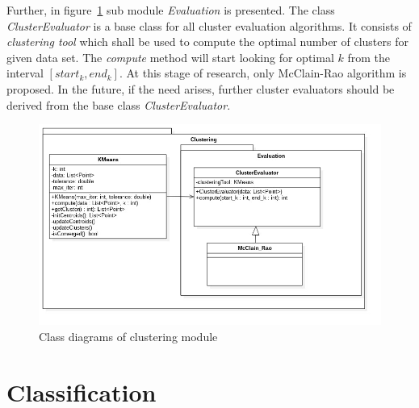 \documentclass{mini}
\begin{document}
Further, in figure~\ref{fig:clustering_class} sub module \textit{Evaluation} is presented. The class \textit{ClusterEvaluator} is a base class for all cluster evaluation algorithms. It consists of \textit{clustering tool} which shall be used to compute the optimal number of clusters for given data set. The \textit{compute} method will start looking for optimal $k$ from the interval $[start_k, end_k]$. At this stage of research, only McClain-Rao algorithm is proposed. In the future, if the need arises, further cluster evaluators should be derived from the base class \textit{ClusterEvaluator}.

%
%
\begin{figure}[H]
    \centering
    \includegraphics[width=1.0\textwidth]{../uml/classes/clustering.jpg}
    \caption{Class diagrams of clustering module}
    \label{fig:clustering_class}
\end{figure}



\section{Classification}
\end{document}
